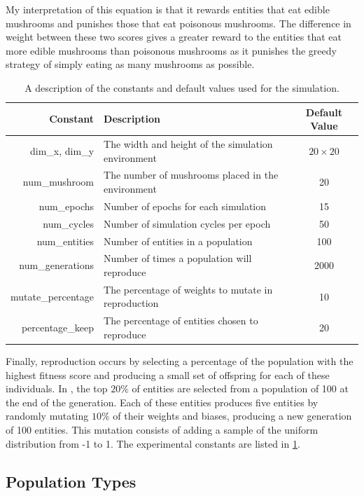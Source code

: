 \documentclass[12pt,a4paper]{report}
\begin{document}
My interpretation of this equation is that it rewards entities that eat edible mushrooms and punishes those that eat poisonous mushrooms. The difference in weight between these two scores gives a greater reward to the entities that eat more edible mushrooms than poisonous mushrooms as it punishes the greedy strategy of simply eating as many mushrooms as possible.

\begin{table}[t]
\centering
 \begin{tabular}{ r | l | c}
 \bf{Constant} & \bf{Description} & \bf{Default Value} \\ [0.5ex] 
 \hline
dim\_x, dim\_y & The width and height of the simulation environment & $20\times20$  \\
num\_mushroom & The number of mushrooms placed in the environment & 20 \\
num\_epochs &  Number of epochs for each simulation & 15 \\ 
num\_cycles & Number of simulation cycles per epoch & 50 \\
num\_entities & Number of entities in a population & 100 \\
num\_generations & Number of times a population will reproduce & 2000 \\
mutate\_percentage & The percentage of weights to mutate in reproduction & 10 \\
percentage\_keep & The percentage of entities chosen to reproduce & 20 \\
\end{tabular}
\caption{A description of the constants and default values used for the simulation.}
\label{table:constants}
\end{table}

Finally, reproduction occurs by selecting a percentage of the population with the highest fitness score and producing a small set of offspring for each of these individuals. In \cite{Cangelosi1998}, the top $20\%$ of entities are selected from a population of 100 at the end of the generation. Each of these entities produces five entities by randomly mutating $10\%$ of their weights and biases, producing a new generation of 100 entities. This mutation consists of adding a sample of the uniform distribution from -1 to 1. The experimental constants are listed in \cref{table:constants}.

\subsection{Population Types}\label{section:populations}
\end{document}
